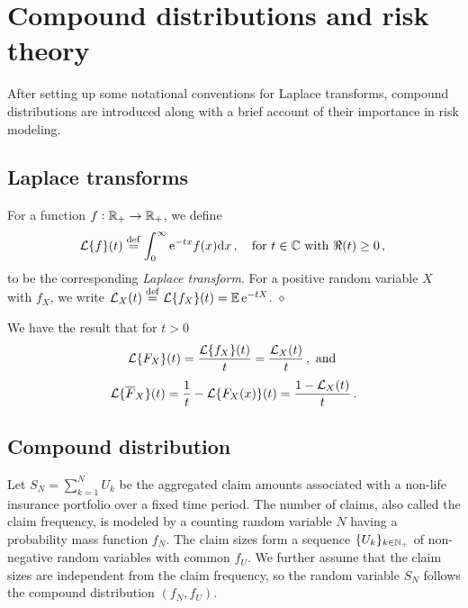\section{Compound distributions and risk theory}\label{sec:Preliminaries}

After setting up some notational conventions for Laplace transforms, compound distributions are introduced along with a brief account of their importance in risk modeling.

\subsection{Laplace transforms} \label{sec:LaplaceProperties}

\begin{definition} \label{def:TransformDefs} For a function $f : \mathbb{R}_+ \to \mathbb{R}_+$, we define
\[
	\mathcal{L}\{f\}(t) \overset{\mathrm{def}}{=} \int_{0}^{\infty} \mathrm{e}^{-t x} f(x) \mathrm{d} x\,, \quad \text{for } t \in \mathbb{C} \text{ with } \Re(t) \ge 0 \,, \\
\]
to be the corresponding \emph{Laplace transform}.
For a positive random variable $X$ with \pdf $f_X$, we write $\mathcal{L}_{X}(t) \overset{\mathrm{def}}{=} \mathcal{L}\{f_X\}(t) = \mathbb E\,\mathrm{e}^{-tX}$. \hfill $\diamond$
\end{definition}

We have the result that for $t>0$
\[ \mathcal{L}\{ F_X \}(t) = \frac{\mathcal{L}\{f_X\}(t)}{t} = \frac{\mathcal{L}_{X}(t)}{t} \,, \text{ and } \]
\[ \mathcal{L}\{ \overline{F}_X \}(t) = \frac1t - \mathcal{L}\{F_X(x) \}(t) = \frac{1 - \mathcal{L}_{X}(t)}{t}  \,. \]


\subsection{Compound distribution}
Let $S_N=\sum_{k=1}^{N}U_k$ be the aggregated claim amounts associated with a non-life insurance portfolio over a fixed time period. The number of claims, also called the claim frequency, is modeled by a counting random variable $N$ having a probability mass function $f_N$. The claim sizes form a sequence $\{U_k\}_{k\in \mathbb{N}_+}$ of \iid non-negative random variables with common \pdf $f_{U}$. We further assume that the claim sizes are independent from the claim frequency, so the random variable $S_N$ follows the compound distribution $(f_N,f_U)$.

